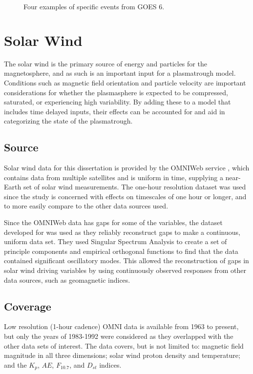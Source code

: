 \begin{figure}[htp!]
	\caption{Four examples of specific events from GOES 6.}
	\label{fig:alldata-examples}
\end{figure}





\section{Solar Wind}
The solar wind is the primary source of energy and particles for the magnetosphere, and as such is an important input for a plasmatrough model. Conditions such as magnetic field orientation and particle velocity are important considerations for whether the plasmasphere is expected to be compressed, saturated, or experiencing high variability. By adding these to a model that includes time delayed inputs, their effects can be accounted for and aid in categorizing the state of the plasmatrough.

\subsection{Source}
Solar wind data for this dissertation is provided by the OMNIWeb service \citep{OMNIWebKing2005}, which contains data from multiple satellites and is uniform in time, supplying a near-Earth set of solar wind measurements. The one-hour resolution dataset was used since the study is concerned with effects on timescales of one hour or longer, and to more easily compare to the other data sources used. 

Since the OMNIWeb data has gaps for some of the variables, the dataset developed for \cite{Kondrashov2014ReconstructionOfGaps} was used as they reliably reconstruct gaps to make a continuous, uniform data set. They used Singular Spectrum Analysis to create a set of principle components and empirical orthogonal functions to find that the data contained significant oscillatory modes. This allowed the reconstruction of gaps in solar wind driving variables by using continuously observed responses from other data sources, such as geomagnetic indices.

\subsection{Coverage}
Low resolution (1-hour cadence) OMNI data is available from 1963 to present, but only the years of 1983-1992 were considered as they overlapped with the other data sets of interest. The data covers, but is not limited to: magnetic field magnitude in all three dimensions; solar wind proton density and temperature; and the $K_p$, $AE$, $F_{10.7}$, and $D_{st}$ indices.

